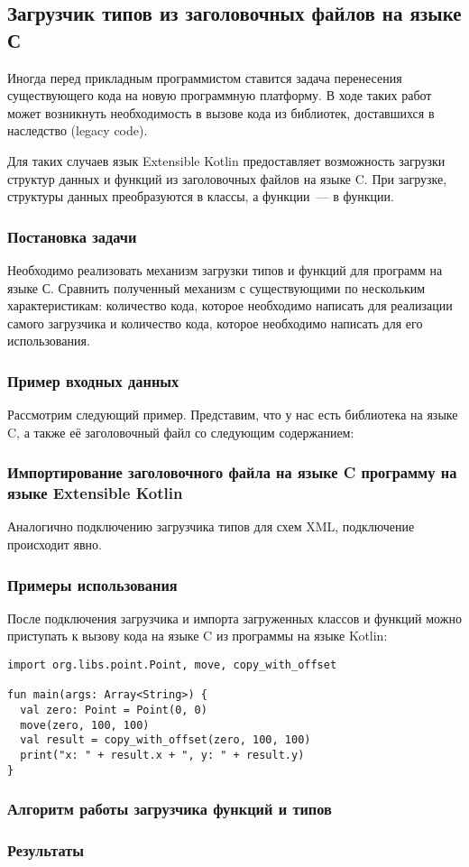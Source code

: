 \subsection{Загрузчик типов из заголовочных файлов на языке С}
Иногда перед прикладным программистом ставится задача перенесения существующего кода на новую программную платформу.
В ходе таких работ может возникнуть необходимость в вызове кода из библиотек, доставшихся в наследство (legacy code).

Для таких случаев язык Extensible Kotlin предоставляет возможность загрузки структур данных и функций из заголовочных файлов на языке C.
При загрузке, структуры данных преобразуются в классы, а функции~--- в функции.

\subsubsection{Постановка задачи}
\td Необходимо реализовать механизм загрузки типов и функций для программ на языке С. Сравнить полученный механизм с существующими по нескольким характеристикам: количество кода, которое необходимо написать для реализации самого загрузчика и количество кода, которое необходимо написать для его использования.

\subsubsection{Пример входных данных}
Рассмотрим следующий пример. Представим, что у нас есть библиотека на языке C, а также её заголовочный файл со следующим содержанием:


\subsubsection{Импортирование заголовочного файла на языке C программу на языке Extensible Kotlin}
Аналогично подключению загрузчика типов для схем XML, подключение происходит явно. \td

\subsubsection{Примеры использования}
После подключения загрузчика и импорта загруженных классов и функций можно приступать к вызову кода на языке C из программы на языке Kotlin:
\begin{lstlisting}
import org.libs.point.Point, move, copy_with_offset

fun main(args: Array<String>) {
  val zero: Point = Point(0, 0)
  move(zero, 100, 100)
  val result = copy_with_offset(zero, 100, 100)
  print("x: " + result.x + ", y: " + result.y)
}
\end{lstlisting}
\subsubsection{Алгоритм работы загрузчика функций и типов}
\subsubsection{Результаты}